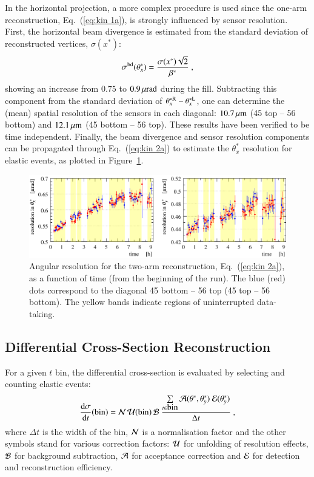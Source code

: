 In the horizontal projection, a more complex procedure is used since the one-arm reconstruction, Eq.~(\ref{eq:kin 1a}), is strongly influenced by sensor resolution. First, the horizontal beam divergence is estimated from the standard deviation of reconstructed vertices, $\sigma(x^*)$:
\begin{equation}
\label{eq:beam div from vertex}
\sigma^{\rm bd}(\theta_x^*) = {\sigma(x^*) \sqrt 2\over \beta^*}\ ,
\end{equation}
showing an increase from $0.75$ to $0.9\,{\rm \mu rad}$ during the fill. Subtracting this component from the standard deviation of $\theta_x^{*\rm R} - \theta_x^{*\rm L}$, one can determine the (mean) spatial resolution of the sensors in each diagonal: $10.7\,{\rm \mu m}$ (45 top -- 56 bottom) and $12.1\,{\rm \mu m}$ (45 bottom -- 56 top). These results have been verified to be time independent. Finally, the beam divergence and sensor resolution components can be propagated through Eq.~({\ref{eq:kin 2a}}) to estimate the $\theta_x^*$ resolution for elastic events, as plotted in Figure~\ref{fig:resol final}.


\begin{figure}
\begin{center}
\includegraphics{fig/resolutions_vs_time.pdf}
\caption{%
Angular resolution for the two-arm reconstruction, Eq.~(\ref{eq:kin 2a}), as a function of time (from the beginning of the run). The blue (red) dots correspond to the diagonal 45 bottom -- 56 top (45 top -- 56 bottom). The yellow bands indicate regions of uninterrupted data-taking.
}
\label{fig:resol final}
\end{center}
\end{figure}

\subsection{Differential Cross-Section Reconstruction}
\label{sec:diff cs}

For a given $t$ bin, the differential cross-section is evaluated by selecting and counting elastic events:
\begin{equation}
{\d\sigma\over \d t}(\hbox{bin}) =
	{\cal N}\, {\cal U}({\rm bin})\, {\cal B}\ 
	{\sum\limits_{t \in \hbox{bin}} {\cal A}(\theta^*, \theta_y^*)\ {\cal E}(\theta_y^*)\over \Delta t}\ ,
\end{equation}
where $\Delta t$ is the width of the bin, ${\cal N}$ is a normalisation factor and the other symbols stand for various correction factors:
 ${\cal U}$ for unfolding of resolution effects, ${\cal B}$ for background subtraction, ${\cal A}$ for acceptance correction and ${\cal E}$ for detection and reconstruction efficiency.

